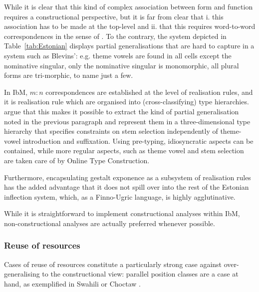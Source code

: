 While it is clear that this kind of complex association between form
and function requires a constructional perspective, but it is far from
clear that i. this association has to be made at the top-level and
ii. that this requires word-to-word correspondences in the sense of
\citet{Blevins05,Blevins14}. To the contrary, the system depicted in
Table~\ref{tab:Estonian} displays partial generalisations that are
hard to capture in a system such as Blevins': e.g. theme vowels are
found in all cells except the nominative singular, only the nominative
singular is monomorphic, all plural forms are tri-morphic, to name
just a few.  

In IbM, $m:n$ correspondences are established at the level of
realisation rules, and it is realisation rule which are organised into
(cross-classifying) type
hierarchies. \citet{Crysmann:Bonami:2017:HPSG} argue that this
makes it possible to extract the kind of partial generalisation noted
in the previous paragraph and represent them in a three-dimensional
type hierarchy that specifies constraints on stem selection
independently of theme-vowel introduction and suffixation. Using
pre-typing, idiosyncratic aspects can be contained, while more regular
aspects, such as theme vowel and stem selection are taken care of by
Online Type Construction. 

Furthermore, encapsulating gestalt exponence as a subsystem of
realisation rules has the added advantage that it does not spill over
into the rest of the Estonian inflection system, which, as a
Finno-Ugric language,  is highly agglutinative.


While it is straightforward to implement constructional analyses
within IbM, non-constructional analyses are actually preferred
whenever possible.  

\subsubsection{Reuse of resources}

Cases of reuse of resources constitute a particularly strong case
against over-generalising to the constructional view: parallel
position classes are a case at hand, as exemplified in Swahili
\citep{Stump93,Crysmann:Bonami:2016} or Choctaw \citep{broadwell:2017}. 

